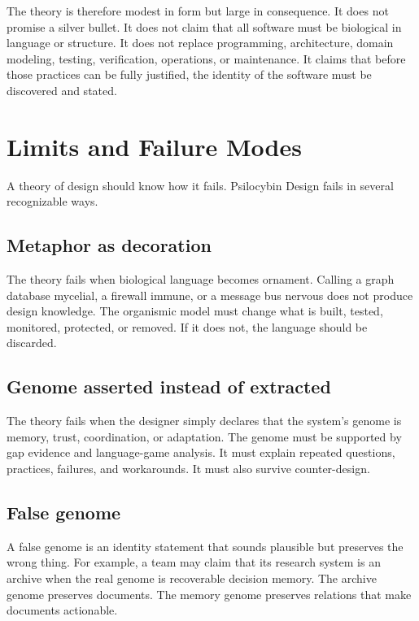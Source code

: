 \documentclass[11pt]{article}
\begin{document}
The theory is therefore modest in form but large in consequence. It does not promise a silver bullet. It does not claim that all software must be biological in language or structure. It does not replace programming, architecture, domain modeling, testing, verification, operations, or maintenance. It claims that before those practices can be fully justified, the identity of the software must be discovered and stated.

\section{Limits and Failure Modes}

A theory of design should know how it fails. Psilocybin Design fails in several recognizable ways.

\subsection{Metaphor as decoration}

The theory fails when biological language becomes ornament. Calling a graph database mycelial, a firewall immune, or a message bus nervous does not produce design knowledge. The organismic model must change what is built, tested, monitored, protected, or removed. If it does not, the language should be discarded.

\subsection{Genome asserted instead of extracted}

The theory fails when the designer simply declares that the system's genome is memory, trust, coordination, or adaptation. The genome must be supported by gap evidence and language-game analysis. It must explain repeated questions, practices, failures, and workarounds. It must also survive counter-design.

\subsection{False genome}

A false genome is an identity statement that sounds plausible but preserves the wrong thing. For example, a team may claim that its research system is an archive when the real genome is recoverable decision memory. The archive genome preserves documents. The memory genome preserves relations that make documents actionable.
\end{document}
